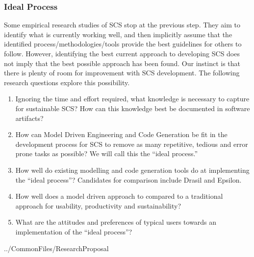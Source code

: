\documentclass[12pt]{article}
\begin{document}
\subsubsection*{Ideal Process}

Some empirical research studies of SCS stop at the previous step.  They aim to
identify what is currently working well, and then implicitly assume that the
identified process/methodologies/tools provide the best guidelines for others to
follow.  However, identifying the best current approach to developing SCS does
not imply that the best possible approach has been found.  Our instinct is that
there is plenty of room for improvement with SCS development.  The following
research questions explore this possibility.

\begin{enumerate}
\item Ignoring the time and effort required, what knowledge is necessary to
  capture for sustainable SCS?  How can this knowledge best be documented in
  software artifacts?
\item How can Model Driven Engineering and Code Generation be fit in the
  development process for SCS to remove as many repetitive, tedious and error
  prone tasks as possible?  We will call this the ``ideal process.''
\item How well do existing modelling and code generation tools do at
  implementing the ``ideal process''?  Candidates for comparison include Drasil
  and Epsilon.
\item How well does a model driven approach to compared to a traditional
  approach for usability, productivity and sustainability?
\item What are the attitudes and preferences of typical users towards
  an implementation of the ``ideal process''?
\end{enumerate}


 {../CommonFiles/ResearchProposal}
\end{document}
